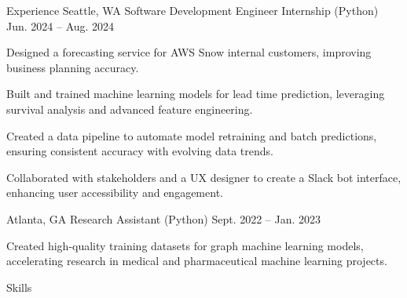 \documentclass[10pt]{article}
\begin{document}
\begin{customsection}{Experience}
    {Seattle, WA}
    {Software Development Engineer Internship (Python)}
    {Jun. 2024 -- Aug. 2024}
    {
        \item Designed a forecasting service for AWS Snow internal customers, improving business planning accuracy.
        \item Built and trained machine learning models for lead time prediction, leveraging survival analysis and advanced feature engineering.
        \item Created a data pipeline to automate model retraining and batch predictions, ensuring consistent accuracy with evolving data trends.
        \item Collaborated with stakeholders and a UX designer to create a Slack bot interface, enhancing user accessibility and engagement.
    }

    {Atlanta, GA}
    {Research Assistant (Python)}
    {Sept. 2022 -- Jan. 2023}
    {
        \item Created high-quality training datasets for graph machine learning models, accelerating research in medical and pharmaceutical machine learning projects.
    }
    
\end{customsection}
 
\begin{customsectionnoskip}{Skills}

     \\
     \\

\end{customsectionnoskip}
\end{document}
